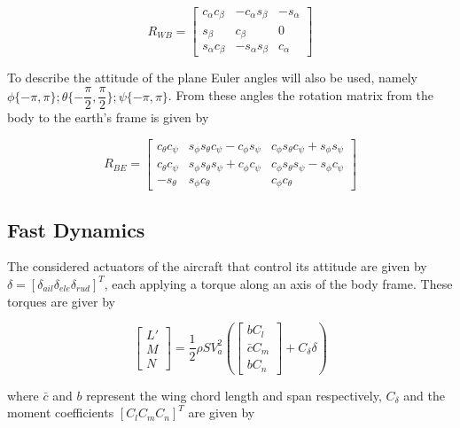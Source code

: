 \begin{equation}
R_{WB}=
\begin{bmatrix}
c_\alpha c_\beta & -c_\alpha s_\beta & -s_\alpha \\
s_\beta & c_\beta & 0 \\
s_\alpha c_\beta & -s_\alpha s_\beta & c_\alpha
\end{bmatrix}
\label{eq:wind2body}
\end{equation}

To describe the attitude of the plane Euler angles will also be used, namely $\phi\{-\pi,\pi\}; \theta \{-\dfrac{\pi}{2},\dfrac{\pi}{2}\}; \psi \{-\pi,\pi\}$. From these angles the rotation matrix from the body to the earth's frame is given by

\begin{equation}
R_{BE}=
\begin{bmatrix}
c_\theta c_\psi & s_\phi s_\theta c_\psi - c_\phi s_\psi & c_\phi s_\theta c_\psi + s_\phi s_\psi \\
c_\theta c_\psi & s_\phi s_\theta s_\psi + c_\phi c_\psi & c_\phi s_\theta s_\psi - s_\phi c_\psi \\
-s_\theta & s_\phi c_\theta & c_\phi c_\theta
\end{bmatrix}
\label{eq:body2earth}
\end{equation}

\subsection{Fast Dynamics}
\label{section:background/model/fast_dynamics}

The considered actuators of the aircraft that control its attitude are given by $\delta = [\delta_{ail} \delta_{ele} \delta_{rud}]^T$, each applying a torque along an axis of the body frame. These torques are giver by

\begin{equation}
\begin{bmatrix}
L'\\
M\\
N
\end{bmatrix}
= \dfrac{1}{2}\rho S V_a^2\left(
\begin{bmatrix}
bC_l\\
\bar{c}C_m\\
bC_n
\end{bmatrix}
+ C_\delta \delta\right)
\label{eq:torque}
\end{equation}

where $\bar{c}$ and $b$ represent the wing chord length and span respectively, $C_\delta$ and the moment coefficients $[C_l C_m C_n]^T$ are given by

